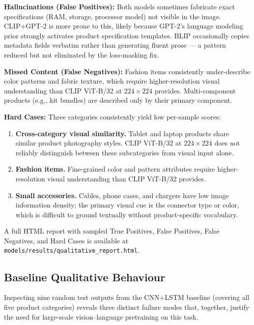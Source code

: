 \documentclass[12pt,a4paper]{article}
\begin{document}
\textbf{Hallucinations (False Positives):} Both models sometimes fabricate exact
specifications (RAM, storage, processor model) not visible in the image. CLIP+GPT-2
is more prone to this, likely because GPT-2's language modeling prior strongly
activates product specification templates. BLIP occasionally copies metadata fields
verbatim rather than generating fluent prose --- a pattern reduced but not eliminated
by the loss-masking fix.

\textbf{Missed Content (False Negatives):} Fashion items consistently under-describe
color patterns and fabric texture, which require higher-resolution visual understanding
than CLIP ViT-B/32 at $224 \times 224$ provides. Multi-component products (e.g.,
kit bundles) are described only by their primary component.

\textbf{Hard Cases:} Three categories consistently yield low per-sample scores:
\begin{enumerate}[noitemsep]
  \item \textbf{Cross-category visual similarity.} Tablet and laptop products share
        similar product photography styles. CLIP ViT-B/32 at $224 \times 224$
        does not reliably distinguish between these subcategories from visual input alone.
  \item \textbf{Fashion items.} Fine-grained color and pattern attributes require
        higher-resolution visual understanding than CLIP ViT-B/32 provides.
  \item \textbf{Small accessories.} Cables, phone cases, and chargers have low image
        information density; the primary visual cue is the connector type or color,
        which is difficult to ground textually without product-specific vocabulary.
\end{enumerate}

A full HTML report with sampled True Positives, False Positives, False Negatives, and
Hard Cases is available at \texttt{models/results/qualitative\_report.html}.

\subsection{Baseline Qualitative Behaviour}
\label{sec:baseline_qual}

Inspecting nine random test outputs from the CNN+LSTM baseline (covering all five
product categories) reveals three distinct failure modes that, together, justify the
need for large-scale vision--language pretraining on this task.
\end{document}
